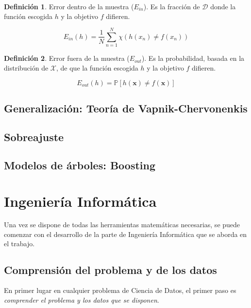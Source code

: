 \documentclass[a4paper,11pt]{book}\usepackage[]{graphicx}\usepackage[]{color}
\theoremstyle{plain}
\theoremstyle{definition}
\newtheorem{definicion}{Definición}[chapter]
\begin{document}
\begin{definicion}
  Error dentro de la muestra ($E_{in}$). Es la fracción de $\mathcal{D}$ donde la función escogida $h$ y la objetivo $f$ difieren.

  \[
    E_{in}(h) = \frac{1}{N} \sum\limits_{n=1}^N \chi(h(x_n) \neq f(x_n))
  \]
\end{definicion}

\begin{definicion}
  Error fuera de la muestra ($E_{out}$). Es la probabilidad, basada en la distribución
  de $\mathcal{X}$, de que la función escogida $h$ y la objetivo $f$ difieren.

  \[
    E_{out}(h) = \mathbb{P}[h(\textbf{x}) \neq f(\textbf{x})]
  \]
\end{definicion}


\subsection{Generalización: Teoría de Vapnik-Chervonenkis}

\subsection{Sobreajuste}

\subsection{Modelos de árboles: Boosting}


\newpage
\section{Ingeniería Informática}
\label{sec:informatica}
Una vez se dispone de todas las herramientas matemáticas necesarias,
se puede comenzar con el desarrollo de la parte de Ingeniería Informática que
se aborda en el trabajo.

\subsection{Comprensión del problema y de los datos}
\label{subsec:comprension}

En primer lugar en cualquier problema de Ciencia de Datos, el primer
paso es \emph{comprender el problema y los datos que se disponen}.
\end{document}
